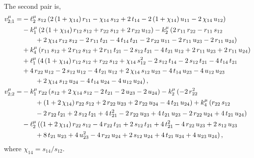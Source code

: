 \documentclass[aps,prd,preprint,groupedaddress,nofootinbib,showpacs,eqsecnum]{revtex4}
\begin{document}
The second pair is,
\begin{equation}
\begin{aligned}
v_{2;1}^\mu =&
-\ell_2^\mu\,s_{12}\,(2\,(1+\chi_{14})\,r_{11}-\chi_{14}\,s_{12}+2\,t_{14}
-2\,(1+\chi_{14})\,u_{11}-2\,\chi_{14}\,u_{12})
\\ &
-k_{1}^\mu\,(2\,(1+\chi_{14})\,r_{12}\,s_{12}+r_{22}\,s_{12}
+2\,r_{22}\,u_{12})
-k_{2}^\mu\,(2\,r_{11}\,r_{22}-r_{11}\,s_{12}
\\ & \hspace*{7mm}
+2\,\chi_{14}\,r_{12}\,s_{12}-2\,r_{11}\,t_{21}
-4\,t_{14}\,t_{21}-2\,r_{22}\,u_{11}-2\,r_{11}\,u_{23}
-2\,r_{11}\,u_{24})
\\ &
+k_{4}^\mu\,(r_{11}\,s_{12}+2\,r_{12}\,s_{12}+2\,r_{11}\,t_{21}
-2\,s_{12}\,t_{21}-4\,t_{21}\,u_{12}+2\,r_{11}\,u_{23}
+2\,r_{11}\,u_{24})
\\ &
+\ell_1^\mu\,(4\,(1+\chi_{14})\,r_{12}\,s_{12}+r_{22}\,s_{12}
+\chi_{14}\,s_{12}^{2}-2\,s_{12}\,t_{14}
-2\,s_{12}\,t_{21}-4\,t_{14}\,t_{21}
\\ &
+4\,r_{22}\,u_{12}
-2\,s_{12}\,u_{12}-4\,t_{21}\,u_{12}
+2\,\chi_{14}\,s_{12}\,u_{23}-4\,t_{14}\,u_{23}
-4\,u_{12}\,u_{23}
\\ &\hspace*{7mm}
+2\,\chi_{14}\,s_{12}\,u_{24}
-4\,t_{14}\,u_{24}-4\,u_{12}\,u_{24})
\,,
\\
%
v_{2;2}^\mu =&
-k_{1}^\mu\,r_{22}\,(s_{12}+2\,\chi_{14}\,s_{12}-2\,t_{21}-2\,u_{23}
-2\,u_{24})
-k_{2}^\mu\,(-2\,r_{22}^{2}
\\ &\hspace*{7mm}
+(1+2\,\chi_{14})\,r_{22}\,s_{12}
+2\,r_{22}\,u_{23}+2\,r_{22}\,u_{24}-4\,t_{21}\,u_{24})
+k_{4}^\mu\,(r_{22}\,s_{12}
\\ &\hspace*{7mm}
-2\,r_{22}\,t_{21}+2\,s_{12}\,t_{21}
+4\,t_{21}^{2}-2\,r_{22}\,u_{23}+4\,t_{21}\,u_{23}
-2\,r_{22}\,u_{24}+4\,t_{21}\,u_{24})
\\ &
-\ell_2^\mu\,((1+2\,\chi_{14})\,r_{22}\,s_{12}-4\,r_{22}\,t_{21}
+2\,s_{12}\,t_{21}+4\,t_{21}^{2}-4\,r_{22}\,u_{23}
+2\,s_{12}\,u_{23}
\\ &\hspace*{7mm}
+8\,t_{21}\,u_{23}+4\,u_{23}^{2}
-4\,r_{22}\,u_{24}+2\,s_{12}\,u_{24}+4\,t_{21}\,u_{24}
+4\,u_{23}\,u_{24})
\,,
%
\end{aligned}
\label{MasslessDoubleBoxVector2}
\end{equation}
where $\chi_{14} = s_{14}/s_{12}$.
\end{document}
